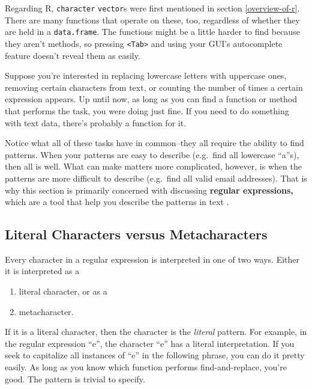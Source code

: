 \documentclass[
  12pt,
  krantz2]{krantz}
\providecommand{\tightlist}{%
  \setlength{\itemsep}{0pt}\setlength{\parskip}{0pt}}
\begin{document}
Regarding R, \texttt{character} \texttt{vector}s were first mentioned in section \ref{overview-of-r}. There are many functions that operate on these, too, regardless of whether they are held in a \texttt{data.frame}. The functions might be a little harder to find because they aren't methods, so pressing \texttt{\textless{}Tab\textgreater{}} and using your GUI's autocomplete feature doesn't reveal them as easily.

Suppose you're interested in replacing lowercase letters with uppercase ones, removing certain characters from text, or counting the number of times a certain expression appears. Up until now, as long as you can find a function or method that performs the task, you were doing just fine. If you need to do something with text data, there's probably a function for it.

Notice what all of these tasks have in common--they all require the ability to find patterns. When your patterns are easy to describe (e.g.~find all lowercase ``a''s), then all is well. What can make matters more complicated, however, is when the patterns are more difficult to describe (e.g.~find all valid email addresses). That is why this section is primarily concerned with discussing \textbf{regular expressions,} which are a tool that help you describe the patterns in text \citep{rfords} \citep{pythonregexprs}.

\hypertarget{literal-characters-versus-metacharacters}{%
\subsection{Literal Characters versus Metacharacters}\label{literal-characters-versus-metacharacters}}

Every character in a regular expression is interpreted in one of two ways. Either it is interpreted as a

\begin{enumerate}
\def\labelenumi{\arabic{enumi}.}
\tightlist
\item
  literal character, or as a
\item
  metacharacter.
\end{enumerate}

If it is a literal character, then the character is the \emph{literal} pattern. For example, in the regular expression ``e'', the character ``e'' has a literal interpretation. If you seek to capitalize all instances of ``e'' in the following phrase, you can do it pretty easily. As long as you know which function performs find-and-replace, you're good. The pattern is trivial to specify.
\end{document}
